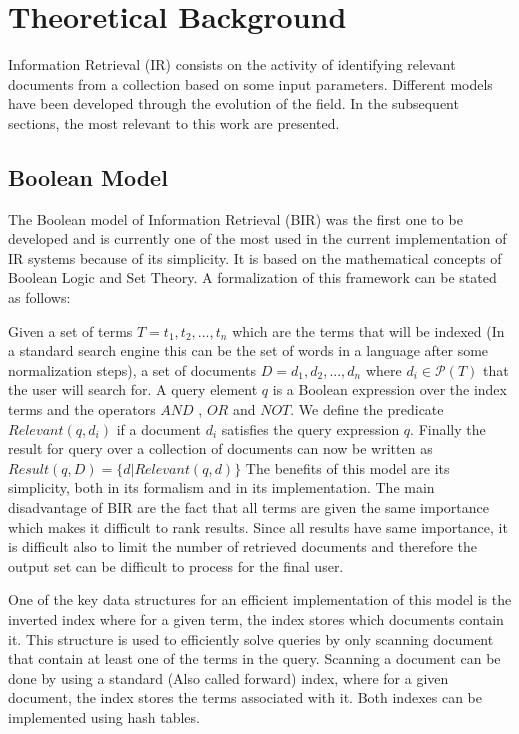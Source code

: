 \chapter{Theoretical Background}
\label{chapter-theoretical_background}
Information Retrieval (IR) consists on the activity of identifying relevant documents from a collection based on some input parameters.
Different models have been developed through the evolution of the field. In the subsequent sections, the most relevant to this work are presented.

\section{Boolean Model}
The Boolean model of Information Retrieval (BIR) was the first one to be developed and is currently one of the most used in the current implementation of IR systems because of its simplicity. It is based on the mathematical concepts of Boolean Logic and Set Theory. A formalization of this framework can be stated as follows: 

Given a set of terms $T = {t_1, t_2, ... , t_n}$ which are the terms that will be indexed (In a standard search engine this can be the set of words in a language after some normalization steps), a set of documents $D = {d_1, d_2, ... , d_n} $ where $d_i \in \mathcal{P}(T) $ that the user will search for. 
A query element $q$ is a Boolean expression over the index terms and the operators $AND$ , $OR$ and $NOT$. We define the predicate $ Relevant(q, d_i) $ if a document $d_i$ satisfies the query expression $q$.
Finally the result for query over a collection of documents can now be written as $Result(q, D) = \{d | Relevant(q, d)\}$
The benefits of this model are its simplicity, both in its formalism and in its implementation. 
The main disadvantage of  BIR are the fact that all terms are given the same importance which makes it difficult to rank results. Since all results have same importance, it is difficult also to limit the number of retrieved documents and therefore the output set can be difficult to process for the final user.

One of the key data structures for an efficient implementation of this model is the inverted index where for a given term, the index stores which documents contain it. This structure is used to efficiently solve queries by only scanning document that contain at least one of the terms in the query. Scanning a document can be done by using a standard (Also called forward) index, where for a given document, the index stores the terms associated with it. Both indexes can be implemented using hash tables.

